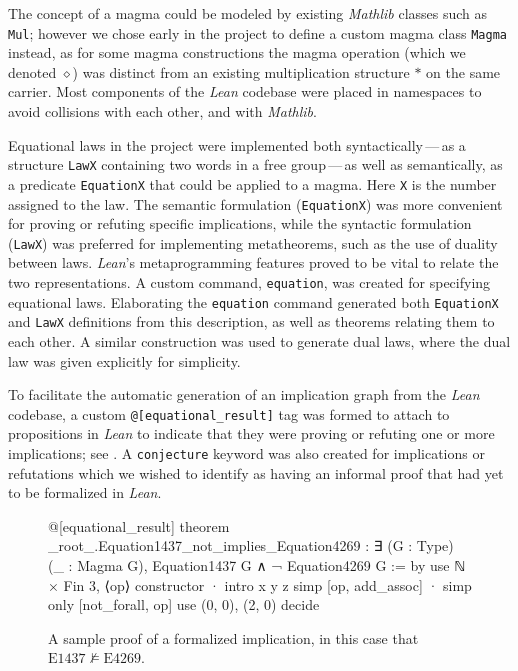 \documentclass[12pt]{amsart}
\theoremstyle{definition}
\newcommand{\op}{\diamond}
\newcommand{\nmodels}{\not\models}
\newcommand{\Eq}[1]{\mathrm{E}#1}
\begin{document}
The concept of a magma could be modeled by existing \emph{Mathlib} classes such as \texttt{Mul}; however we chose early in the project to define a custom magma class \texttt{Magma} instead, as for some magma constructions the magma operation (which we denoted $\op$) was distinct from an existing multiplication structure $*$ on the same carrier.  Most components of the \emph{Lean} codebase were placed in namespaces to avoid collisions with each other, and with \emph{Mathlib}.

Equational laws in the project were implemented both syntactically\,---\,as a structure \texttt{LawX} containing two words in a free group\,---\,as well as semantically, as a predicate \texttt{EquationX} that could be applied to a magma. Here \texttt{X} is the number assigned to the law. The semantic formulation (\texttt{EquationX}) was more convenient for proving or refuting specific implications, while the syntactic formulation (\texttt{LawX}) was preferred for implementing metatheorems, such as the use of duality between laws. \emph{Lean}'s metaprogramming features proved to be vital to relate the two representations. A custom command, \texttt{equation}, was created for specifying equational laws. Elaborating the \texttt{equation} command generated both \texttt{EquationX} and \texttt{LawX} definitions from this description, as well as theorems relating them to each other. A similar construction was used to generate dual laws, where the dual law was given explicitly for simplicity.

To facilitate the automatic generation of an implication graph from the \emph{Lean} codebase, a custom \texttt{@{[}equational\_result{]}} tag was formed to attach to propositions in \emph{Lean} to indicate that they were proving or refuting one or more implications; see .  A \texttt{conjecture} keyword was also created for implications or refutations which we wished to identify as having an informal proof that had yet to be formalized in \emph{Lean}.

\begin{figure}
\centering
\begin{lean}
@[equational_result]
theorem _root_.Equation1437_not_implies_Equation4269 :
    ∃ (G : Type) (_ : Magma G), Equation1437 G ∧ ¬ Equation4269 G := by
  use ℕ × Fin 3, ⟨op⟩
  constructor
  · intro x y z
    simp [op, add_assoc]
  · simp only [not_forall, op]
    use (0, 0), (2, 0)
    decide
\end{lean}
\caption{A sample proof of a formalized implication, in this case that $\Eq{1437} \nmodels \Eq{4269}$.}
\label{fig:impl}
\end{figure}
\end{document}
